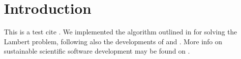 \section{Introduction}

This is a test cite \cite{Ziemer_2012}. We implemented the algorithm outlined in \cite{Izzo_2014} for solving the Lambert problem, following also the developments of \cite{gooding1990procedure} and \cite{blanchard1969unified}. More info on sustainable scientific software development may be found on \cite{brown2015run}.
